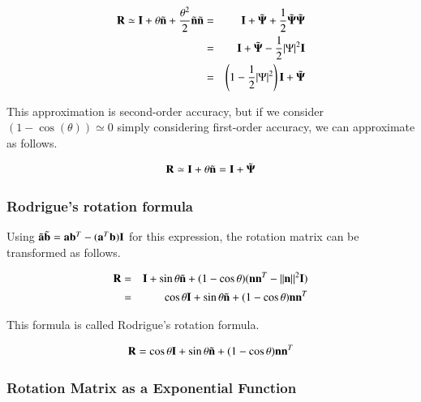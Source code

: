 \begin{eqnarray}
\mathbf{R} \simeq \mathbf{I} + \theta\tilde{\mathbf{n}} + \frac{\theta^2}{2}\tilde{\mathbf{n}}\tilde{\mathbf{n}}
&=& \mathbf{I} + \tilde{\mathbf{\Psi}} + \frac{1}{2}\tilde{\mathbf{\Psi}}\tilde{\mathbf{\Psi}}\\
&=&  \mathbf{I} + \tilde{\mathbf{\Psi}} - \frac{1}{2}|\Psi|^2\mathbf{I}\\
&=& \left(1- \frac{1}{2}|\Psi|^2\right)\mathbf{I} + \tilde{\mathbf{\Psi}}
\end{eqnarray}

This approximation is second-order accuracy, but if we consider $(1-\cos(\theta))\simeq0$ simply considering first-order accuracy, we can approximate as follows.

\begin{tcolorbox}[title=infinitesimal rotation (1st order approximation)]
\begin{equation}
\mathbf{R} \simeq \mathbf{I} + \theta\tilde{\mathbf{n}} = \mathbf{I} + \tilde{\mathbf{\Psi}}
\end{equation}
\end{tcolorbox}



\subsubsection{Rodrigue's rotation formula}

Using $\tilde{\mathbf{a}}\tilde{\mathbf{b}} = \mathbf{a}\mathbf{b}^T - (\mathbf{a}^T\mathbf{b})\mathbf{I}$ for this expression, the rotation matrix can be transformed as follows.

\begin{eqnarray}
\mathbf{R}
&=& \mathbf{I} + \sin\theta\tilde{\mathbf{n}} + (1-\cos\theta)(\mathbf{n}\mathbf{n}^T-||\mathbf{n}||^2\mathbf{I})\\
&=& \cos\theta\mathbf{I} + \sin\theta\tilde{\mathbf{n}} + (1-\cos\theta)\mathbf{n}\mathbf{n}^T
\end{eqnarray}

This formula is called Rodrigue's rotation formula.

\begin{tcolorbox}[title=Rodrigue's rotation formula]
\begin{equation}
\mathbf{R} = \cos\theta\mathbf{I} + \sin\theta\tilde{\mathbf{n}} + (1-\cos\theta)\mathbf{n}\mathbf{n}^T
\end{equation}
\end{tcolorbox}


\subsubsection{Rotation Matrix as a Exponential Function}

